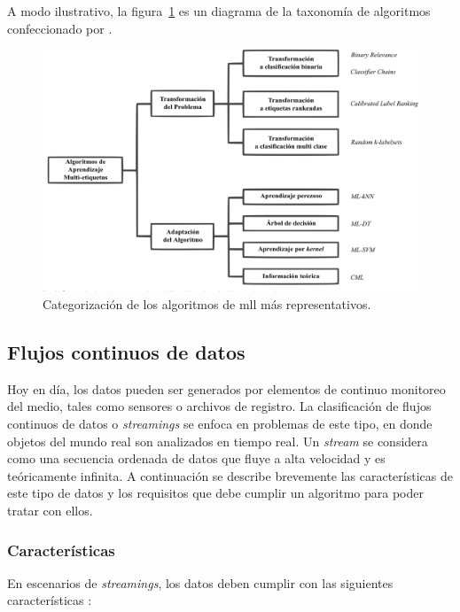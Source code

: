 A modo ilustrativo, la figura~\ref{fig:algorithm_taxonomy} es un diagrama de la
taxonomía de algoritmos confeccionado por \citeauthor{zhang_review_2014} \cite
{zhang_review_2014}.

\begin{figure}
	\includegraphics[width=\linewidth]{figures/algorithm_taxonomy.png}
	\caption{Categorización de los algoritmos de \acrshort{mll} más representativos.}
	\label{fig:algorithm_taxonomy}
\end{figure}

\subsection{Flujos continuos de datos}
\label{intro_streams}

Hoy en día, los datos pueden ser generados por elementos de continuo monitoreo
del medio, tales como sensores o archivos de registro.  La clasificación de
flujos continuos de datos o \textit{streamings} se enfoca en problemas de este
tipo, en donde objetos del mundo real son analizados en tiempo real. Un
\textit{stream} se considera como una secuencia ordenada de datos que fluye a
alta velocidad y es teóricamente infinita. A continuación se describe brevemente
las características de este tipo de datos y los requisitos que debe cumplir un
algoritmo para poder tratar con ellos.

\subsubsection{Características}
\label{stream_caracteristicas}

En escenarios de \textit{streamings}, los datos deben cumplir con las siguientes
características \cite {gama_knowledge_2010}:

